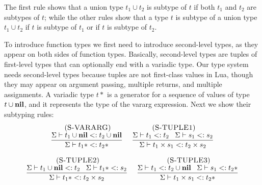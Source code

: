 The first rule shows that a union type $t_{1} \cup t_{2}$
is subtype of $t$ if both $t_{1}$ and $t_{2}$ are subtypes
of $t$;
while the other rules show that a type $t$ is subtype
of a union type $t_{1} \cup t_{2}$ if $t$ is subtype of
$t_{1}$ or if $t$ is subtype of $t_{2}$.

To introduce function types we first need to introduce
second-level types, as they appear on both sides of function types.
Basically, second-level types are tuples of first-level types
that can optionally end with a variadic type.
Our type system needs second-level types because tuples are
not first-class values in Lua, though they may appear on
argument passing, multiple returns, and multiple assignments.
A variadic type $t*$ is a generator for a sequence of values of
type $t \cup \mathbf{nil}$, and it represents the type of the vararg
expression.
Next we show their subtyping rules:
\[
\begin{array}{c}
\begin{array}{c}
\; (\textsc{S-VARARG})\\
\dfrac{\Sigma \vdash t_{1} \cup \mathbf{nil} <: t_{2} \cup \mathbf{nil}}
      {\Sigma \vdash t_{1}* <: t_{2}*}
\end{array}
\;
\begin{array}{c}
\; (\textsc{S-TUPLE1})\\
\dfrac{\Sigma \vdash t_{1} <: t_{2} \;\;\;
       \Sigma \vdash s_{1} <: s_{2}}
      {\Sigma \vdash t_{1} \times s_{1} <: t_{2} \times s_{2}}
\end{array}
\\ \\
\begin{array}{c}
\; (\textsc{S-TUPLE2})\\
\dfrac{\Sigma \vdash t_{1} \cup \mathbf{nil} <: t_{2} \;\;\;
       \Sigma \vdash t_{1}* <: s_{2}}
      {\Sigma \vdash t_{1}* <: t_{2} \times s_{2}}
\end{array}
\;
\begin{array}{c}
\; (\textsc{S-TUPLE3})\\
\dfrac{\Sigma \vdash t_{1} <: t_{2} \cup \mathbf{nil} \;\;\;
       \Sigma \vdash s_{1} <: t_{2}*}
      {\Sigma \vdash t_{1} \times s_{1} <: t_{2}*}
\end{array}
\end{array}
\]

